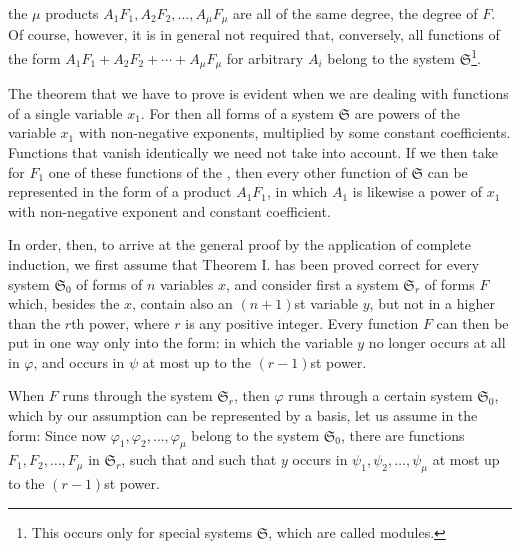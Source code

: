 the $\mu$ products $A_1F_1, A_2F_2, \ldots, A_\mu F_\mu$ are all of the same degree, the degree of $F$. Of course, however, it is in general not required that, conversely, all functions of the form $A_1F_1+A_2F_2+\cdots+A_\mu F_\mu$ for arbitrary $A_i$ belong to the system $\mathfrak S$\footnote{This occurs only for special systems $\mathfrak S$, which are called modules.}.

The theorem that we have to prove is evident when we are dealing with functions of a single variable $x_1$. For then all forms of a system $\mathfrak S$ are powers of the variable $x_1$ with non-negative exponents, multiplied by some constant coefficients. Functions that vanish identically we need not take into account. If we then take for $F_1$ one of these functions of the , then every other function of $\mathfrak S$ can be represented in the form of a product $A_1F_1$, in which $A_1$ is likewise a power of $x_1$ with non-negative exponent and constant coefficient.

In order, then, to arrive at the general proof by the application of complete induction, we first assume that Theorem I. has been proved correct for every system $\mathfrak S_0$ of forms of $n$ variables $x$, and consider first a system $\mathfrak S_r$ of forms $F$ which, besides the $x$, contain also an $(n+1)$st variable $y$, but not in a higher than the $r$th power, where $r$ is any positive integer. Every function $F$ can then be put in one way only into the form:
in which the variable $y$ no longer occurs at all in $\varphi$, and occurs in $\psi$ at most up to the $(r-1)$st power.

When $F$ runs through the system $\mathfrak S_r$, then $\varphi$ runs through a certain system $\mathfrak S_0$, which by our assumption can be represented by a basis, let us assume in the form:
Since now $\varphi_1,\varphi_2,\ldots,\varphi_\mu$ belong to the system $\mathfrak S_0$, there are functions $F_1, F_2,\ldots,F_\mu$ in $\mathfrak S_r$, such that
and such that $y$ occurs in $\psi_1,\psi_2,\ldots,\psi_\mu$ at most up to the $(r-1)$st power.
